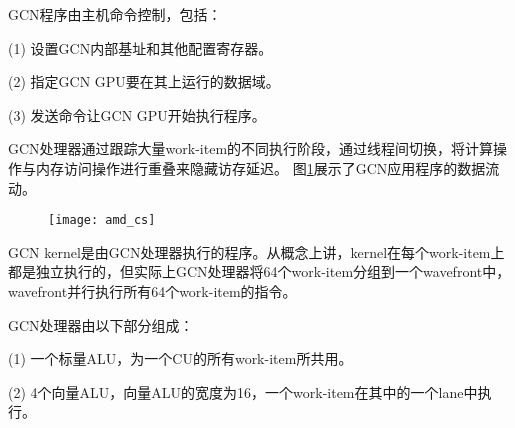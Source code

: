 GCN程序由主机命令控制，包括：

(1) 设置GCN内部基址和其他配置寄存器。

(2) 指定GCN GPU要在其上运行的数据域。

(3) 发送命令让GCN GPU开始执行程序。
%
%
%
%
%
%

GCN处理器通过跟踪大量work-item的不同执行阶段，通过线程间切换，将计算操作与内存访问操作进行重叠来隐藏访存延迟。
图\ref{fig:amd_cs}展示了GCN应用程序的数据流动。
\begin{figure}[htbp]
	\centering
	\texttt{[image: amd\_cs]}
	\label{fig:amd_cs}
\end{figure}

GCN kernel是由GCN处理器执行的程序。从概念上讲，kernel在每个work-item上都是独立执行的，但实际上GCN处理器将64个work-item分组到一个wavefront中，wavefront并行执行所有64个work-item的指令。

GCN处理器由以下部分组成：

(1) 一个标量ALU，为一个CU的所有work-item所共用。

(2)	4个向量ALU，向量ALU的宽度为16，一个work-item在其中的一个lane中执行。

